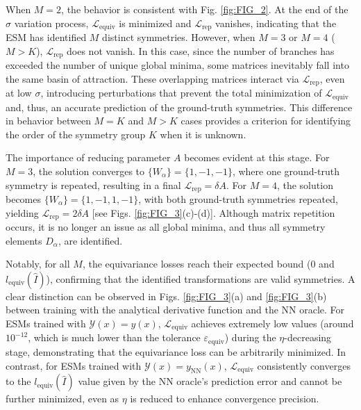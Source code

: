 
When $M = 2$, the behavior is consistent with Fig. \ref{fig:FIG_2}. At the end of the $\sigma$ variation process, $\mathcal{L}_{\mathrm{equiv}}$ is minimized and $\mathcal{L}_{\mathrm{rep}}$ vanishes, indicating that the ESM has identified $M$ distinct symmetries. However, when $M = 3$ or $M = 4$ ($M > K$), $\mathcal{L}_{\mathrm{rep}}$ does not vanish. In this case, since the number of branches has exceeded the number of unique global minima, some matrices inevitably fall into the same basin of attraction. These overlapping matrices interact via $\mathcal{L}_{\mathrm{rep}}$, even at low $\sigma$, introducing perturbations that prevent the total minimization of $\mathcal{L}_{\mathrm{equiv}}$ and, thus, an accurate prediction of the ground-truth symmetries. This difference in behavior between $M = K$ and $M > K$ cases provides a criterion for identifying the order of the symmetry group $K$ when it is unknown.



The importance of reducing parameter $A$ becomes evident at this stage. For $M = 3$, the solution converges to $\{ W_{\alpha} \} = \{ 1, -1, -1 \}$, where one ground-truth symmetry is repeated, resulting in a final $\mathcal{L}_{\mathrm{rep}} = \delta A$. For $M = 4$, the solution becomes $\{ W_{\alpha} \} = \{ 1, -1, 1, -1 \}$, with both ground-truth symmetries repeated, yielding $\mathcal{L}_{\mathrm{rep}} = 2\delta A$ [see Figs. \ref{fig:FIG_3}(c)-(d)]. Although matrix repetition occurs, it is no longer an issue as all global minima, and thus all symmetry elements $D_{\alpha}$, are identified.


Notably, for all $M$, the equivariance losses reach their expected bound ($0$ and $l_{\mathrm{equiv}}(\hat{I})$), confirming that the identified transformations are valid symmetries. A clear distinction can be observed in Figs. \ref{fig:FIG_3}(a) and \ref{fig:FIG_3}(b) between training with the analytical derivative function and the NN oracle. For ESMs trained with $\mathcal{Y}(x) = y(x)$, $\mathcal{L}_{\mathrm{equiv}}$ achieves extremely low values (around $10^{-12}$, which is much lower than the tolerance $\varepsilon_{\mathrm{equiv}}$) during the $\eta$-decreasing stage, demonstrating that the equivariance loss can be arbitrarily minimized. In contrast, for ESMs trained with $\mathcal{Y}(x) = y_{\mathrm{NN}}(x)$, $\mathcal{L}_{\mathrm{equiv}}$ consistently converges to the $l_{\mathrm{equiv}}(\hat{I})$ value given by the NN oracle's prediction error and cannot be further minimized, even as $\eta$ is reduced to enhance convergence precision.


